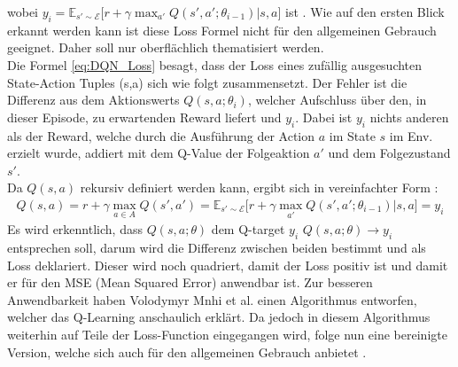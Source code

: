 wobei $y_i = \mathbb{E}_{s' \sim \mathcal{E}} \bigl\lbrack r+\gamma \max_{a'}Q(s',a';\theta_{i-1})|s,a \bigr\rbrack$ ist \cite{DQN}. 
Wie auf den ersten Blick erkannt werden kann ist diese Loss Formel nicht für den allgemeinen Gebrauch geeignet. Daher soll nur oberflächlich thematisiert werden.\\
Die Formel \ref{eq:DQN_Loss} besagt, dass der Loss eines zufällig ausgesuchten State-Action Tuples (s,a) sich wie folgt zusammensetzt. 
Der Fehler ist die Differenz aus dem Aktionswerts $Q(s,a; \theta_{i})$, welcher Aufschluss über den, in dieser Episode, zu erwartenden Reward liefert und $y_i$. Dabei ist $y_i$ nichts anderen als der Reward, welche durch die Ausführung der Action $a$ im State $s$ im Env. erzielt wurde, addiert mit dem Q-Value der Folgeaktion $a'$ und dem Folgezustand $s'$.\\
Da $Q(s,a)$ rekursiv definiert werden kann, ergibt sich in vereinfachter Form \cite[S.126]{DRL_Lapan}:
\begin{align}
	\label{eq:Q-Value_rekursive_def}
	Q(s,a) = r + \gamma \max_{a \in A}Q(s',a') = \mathbb{E}_{s' \sim \mathcal{E}} \bigl\lbrack r+\gamma \max_{a'}Q(s',a';\theta_{i-1})|s,a \bigr\rbrack = y_i
\end{align}
Es wird erkenntlich, dass $Q(s,a;\theta)$ dem Q-target $y_i$ $Q(s,a;\theta) \longrightarrow y_i$ entsprechen soll, darum wird die Differenz zwischen beiden bestimmt und als Loss deklariert. Dieser wird noch quadriert, damit der Loss positiv ist und damit er für den MSE (Mean Squared Error) anwendbar ist.
Zur besseren Anwendbarkeit haben Volodymyr Mnhi et al. einen Algorithmus entworfen, welcher das Q-Learning anschaulich erklärt. Da jedoch in diesem Algorithmus weiterhin auf Teile der Loss-Function eingegangen wird, folge nun eine bereinigte Version, welche sich auch für den allgemeinen Gebrauch anbietet \cite[S. 149 f.]{DRL_Lapan}.
